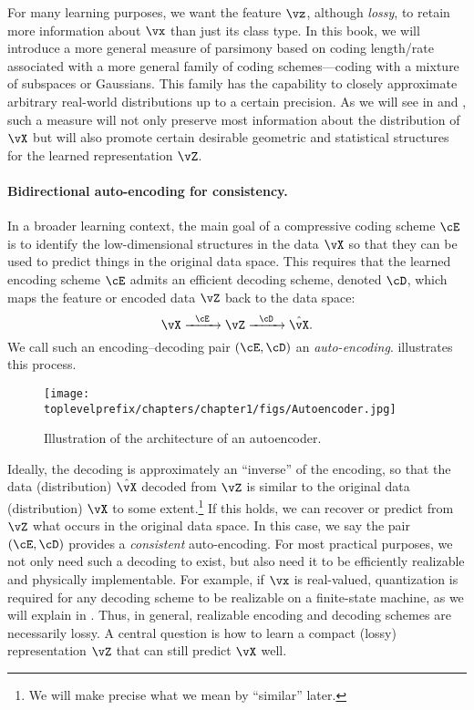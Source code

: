 \documentclass[../../book-main.tex]{subfiles}
\begin{document}
For many learning purposes, we want the feature \(\vz\), although \textit{lossy}, to retain more information about \(\vx\) than just its class type. In this book, we will introduce a more general measure of parsimony based on coding length/rate associated with a more general family of coding schemes---coding with a mixture of subspaces or Gaussians. This family has the capability to closely approximate arbitrary real-world distributions up to a certain precision. As we will see in  and , such a measure will not only preserve most information about the distribution of \(\vX\) but will also promote certain desirable geometric and statistical structures for the learned representation \(\vZ\). 


\paragraph{Bidirectional auto-encoding for consistency.}
In a broader learning context, the main goal of a compressive coding scheme \(\cE\) is to identify the low-dimensional structures in the data \(\vX\) so that they can be used to predict things in the original data space. This requires that the learned encoding scheme \(\cE\) admits an efficient decoding scheme, denoted \(\cD\), which maps the feature or encoded data \(\vZ\) back to the data space:
\begin{equation}
    \vX   \xrightarrow{\hspace{2mm} \cE\hspace{2mm}} \vZ  \xrightarrow{\hspace{2mm} \cD \hspace{2mm}} \hat{\vX}.
       \label{eqn:auto-encoding}
\end{equation}
We call such an encoding--decoding pair \((\cE, \cD)\) an \textit{auto-encoding}.  illustrates this process.
\begin{figure}
    \centering
    \texttt{[image: \\toplevelprefix/chapters/chapter1/figs/Autoencoder.jpg]}
    \caption{Illustration of the architecture of an autoencoder.}
    \label{fig:autoencoder}
\end{figure}

Ideally, the decoding is approximately an ``inverse'' of the encoding, so that the data (distribution) \(\hat{\vX}\) decoded from \(\vZ\) is similar to the original data (distribution) \(\vX\) to some extent.\footnote{We will make precise what we mean by ``similar'' later.} If this holds, we can recover or predict from \(\vZ\) what occurs in the original data space. In this case, we say the pair \((\cE, \cD)\) provides a \textit{consistent} auto-encoding. For most practical purposes, we not only need such a decoding to exist, but also need it to be efficiently realizable and physically implementable. For example, if \(\vx\) is real-valued, quantization is required for any decoding scheme to be realizable on a finite-state machine, as we will explain in . Thus, in general, realizable encoding and decoding schemes are necessarily lossy. A central question is how to learn a compact (lossy) representation \(\vZ\) that can still predict \(\vX\) well.
\end{document}
